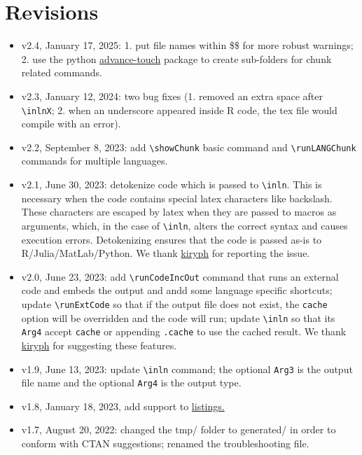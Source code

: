 \documentclass{ltxdoc}
\begin{document}
\section{Revisions}
\label{sec:orge3b69ca}
\begin{itemize}
\item v2.4, January 17, 2025: 1. put file names within \$\$ for more robust
warnings; 2. use the python \href{https://pypi.org/project/advance-touch/}{advance-touch} package to create sub-folders for
chunk related commands.
\item v2.3, January 12, 2024: two bug fixes (1. removed an extra space after
\texttt{\textbackslash{}inlnX}; 2. when an underscore appeared inside R code, the tex file would
compile with an error).
\item v2.2, September 8, 2023: add \texttt{\textbackslash{}showChunk} basic command and \texttt{\textbackslash{}runLANGChunk}
commands for multiple languages.
\item v2.1, June 30, 2023: detokenize code which is passed to \texttt{\textbackslash{}inln}. This is
necessary when the code contains special latex characters like backslash.
These characters are escaped by latex when they are passed to macros as arguments,
which, in the case of \texttt{\textbackslash{}inln}, alters the correct syntax and causes execution errors.
Detokenizing ensures that the code is passed as-is to R/Julia/MatLab/Python.
We thank \href{https://github.com/kiryph}{kiryph} for reporting the issue.
\item v2.0, June 23, 2023: add \texttt{\textbackslash{}runCodeIncOut} command that runs an external code and
embeds the output and andd some language specific shortcuts; update
\texttt{\textbackslash{}runExtCode} so that if the output file does not exist, the \texttt{cache} option will
be overridden and the code will run; update \texttt{\textbackslash{}inln} so that its \texttt{Arg4} accept
\texttt{cache} or appending \texttt{.cache} to use the cached result. We thank \href{https://github.com/kiryph}{kiryph} for
suggesting these features.
\item v1.9, June 13, 2023: update \texttt{\textbackslash{}inln} command; the optional \texttt{Arg3} is the output
file name and the optional \texttt{Arg4} is the output type.
\item v1.8, January 18, 2023, add support to \href{https://ctan.org/pkg/listings?lang=en}{listings.}
\item v1.7, August 20, 2022: changed the tmp/ folder to generated/ in order to
conform with CTAN suggestions; renamed the troubleshooting file.

\end{itemize}
\end{document}
